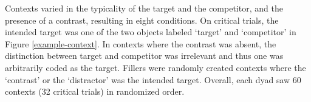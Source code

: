 \documentclass[10pt,letterpaper]{article}
\newcommand{\figref}[1]{Figure \ref{#1}}
\begin{document}

Contexts varied in the typicality of the target and the competitor, and the presence of a contrast, resulting in eight conditions. On critical trials, the intended target was one of the two objects labeled `target' and `competitor' in \figref{example-context}. In contexts where the contrast was absent, the distinction between target and competitor was irrelevant and thus one was arbitrarily coded as the target. Fillers were randomly created contexts where the `contrast' or the `distractor' was the intended target. Overall, each dyad saw 60 contexts (32 critical trials) in randomized order.

\end{document}
